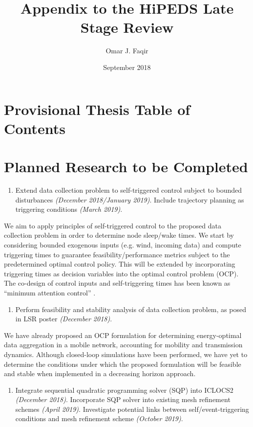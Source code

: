 \documentclass{article}
\title{Appendix to the HiPEDS Late Stage Review }
\author{Omar J. Faqir}
\date{September 2018}
\begin{document}
\maketitle

\section{Provisional Thesis Table of Contents}

\section{Planned Research to be Completed}

\begin{enumerate} [series=myouterlist]
    \item Extend data collection problem to self-triggered control subject to bounded disturbances \textit{(December 2018/January 2019)}. Include trajectory planning as triggering conditions \textit{(March 2019)}.
\end{enumerate}

\noindent We aim to apply principles of self-triggered control to the proposed data collection problem in order to determine node sleep/wake times. We start by considering bounded exogenous inputs (e.g. wind, incoming data) and compute triggering times to guarantee feasibility/performance metrics subject to the predetermined optimal control policy. This will be extended by incorporating triggering times as decision variables into the optimal control problem (OCP). The co-design of control inputs and self-triggering times has been known as ``minimum attention control'' \cite{}. 

\begin{enumerate}[resume=myouterlist]
    \item Perform feasibility and stability analysis of data collection problem, as posed in LSR poster \textit{(December 2018)}.
\end{enumerate}

\noindent We have already proposed an OCP formulation for determining energy-optimal data aggregation in a mobile network, accounting for mobility and transmission dynamics. Although closed-loop simulations have been performed, we have yet to determine the conditions under which the proposed formulation will be feasible and stable when implemented in a decreasing horizon approach.

\begin{enumerate}[resume=myouterlist]
    \item Integrate sequential quadratic programming solver (SQP) into ICLOCS2 \textit{(December 2018)}. Incorporate SQP solver into existing mesh refinement schemes  \textit{(April 2019)}. Investigate potential links between self/event-triggering conditions and mesh refinement scheme \textit{(October 2019)}.
\end{enumerate}
\end{document}
